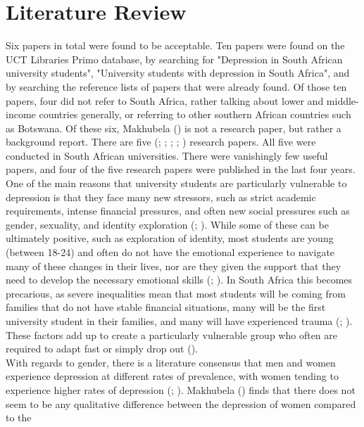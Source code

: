 \documentclass[stu,a4paper,12pt,donotrepeattitle]{apa7}
\begin{document}
\section{Literature Review}
Six papers in total were found to be acceptable. Ten papers were found on the
UCT Libraries Primo database, by searching for "Depression in South African
university students", "University students with depression in South Africa",
and by searching the reference lists of papers that were already found. Of
those ten papers, four did not refer to South Africa, rather talking about
lower and middle-income countries generally, or referring to other southern
African countries such as Botswana. Of these six, Makhubela (\citeyear{makh21})
is not a research paper, but rather a background report. There are five
(\cite{makh21b}; \cite{makhdeb16}; \cite{malletal18}; \cite{mason19};
\cite{roussetal21}) research papers. All five were conducted in South African
universities. There were vanishingly few useful papers, and four of the five
research papers were published in the last four years.\\
One of the main reasons that university students are particularly vulnerable to
depression is that they face many new stressors, such as strict academic
requirements, intense financial pressures, and often new social pressures such
as gender, sexuality, and identity exploration (\cite{malletal18};
\cite{roussetal21}). While some of these can be ultimately positive, such as
exploration of identity, most students are young (between 18-24) and often do
not have the emotional experience to navigate many of these changes in their
lives, nor are they given the support that they need to develop the necessary
emotional skills (\cite{mason19}; \cite{roussetal21}). In South Africa this
becomes precarious, as severe inequalities mean that most students will be
coming from families that do not have stable financial situations, many will be
the first university student in their families, and many will have experienced
trauma (\cite{malletal18}; \cite{roussetal21}). These factors add up to create a
particularly vulnerable group who often are required to adapt fast or simply
drop out (\cite{roussetal21}).\\
With regards to gender, there is a literature consensus that men and women
experience depression at different rates of prevalence, with women tending to
experience higher rates of depression (\cite{makh21b}; \cite{makhdeb16}).
Makhubela (\citeyear{makh21b}) finds that there does not seem to be any
qualitative difference between the depression of women compared to the
\end{document}
